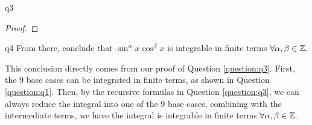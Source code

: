 \documentclass[reqno]{alittlebear}
\begin{document}
\begin{exercise}{}{}
\begin{question}{}{q3}
\begin{proof}
        \end{proof}
    \end{question}
    \begin{question}{}{q4}
        From there, conclude that $\sin^\alpha x\cos ^\beta x$ is integrable in finite terms $\forall \alpha,\beta\in\mathbb{Z}.$
        \qbreak
        \begin{mathnote}
            This conclusion directly comes from our proof of Question \ref{question:q3}. First, the 9 base cases can be integrated in finite terms, as shown in Question \ref{question:q1}. Then, by the recursive formulas in Question \ref{question:q3}, we can always reduce the integral into one of the 9 base cases, combining with the intermediate terms, we have the integral is integrable in finite terms $\forall \alpha,\beta\in\mathbb{Z}.$
            
            \hfill
        \end{mathnote}
    \end{question}
\end{exercise}
\newpage
{}
\end{document}
